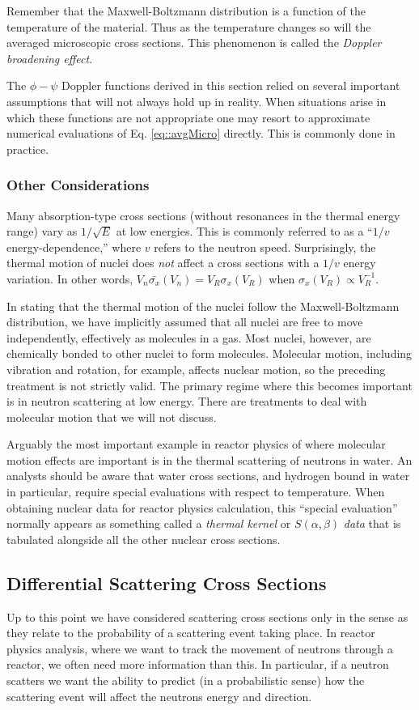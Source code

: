 \documentclass[11pt]{article}
\begin{document}
Remember that the Maxwell-Boltzmann distribution is a function of the temperature of the material.  Thus as the temperature changes so will the averaged microscopic cross sections.  This phenomenon is called the \emph{Doppler broadening effect}.

The \(\phi-\psi\) Doppler functions derived in this section relied on several important assumptions that will not always hold up in reality.  When situations arise in which these functions are not appropriate one may resort to approximate numerical evaluations of Eq. \ref{eq::avgMicro} directly.  This is commonly done in practice.
\subsubsection{Other Considerations}
\label{sec:orgheadline20}
Many absorption-type cross sections (without resonances in the thermal energy range) vary as \(1/\sqrt{E}\) at low energies.  This is commonly referred to as a ``\(1/v\) energy-dependence,'' where \(v\) refers to the neutron speed.  Surprisingly, the thermal motion of nuclei does \emph{not} affect a cross sections with a \(1/v\) energy variation.  In other words, \(V_n \bar{\sigma_x}(V_n) = V_R\sigma_x(V_R)\) when \(\sigma_x(V_R) \propto V_R^{-1}\).

In stating that the thermal motion of the nuclei follow the Maxwell-Boltzmann distribution, we have implicitly assumed that all nuclei are free to move independently, effectively as molecules in a gas.  Most nuclei, however, are chemically bonded to other nuclei to form molecules.  Molecular motion, including vibration and rotation, for example, affects nuclear motion, so the preceding treatment is not strictly valid.  The primary regime where this becomes important is in neutron scattering at low energy. There are treatments to deal with molecular motion that we will not discuss.  

Arguably the most important example in reactor physics of where molecular motion effects are important is in the thermal scattering of neutrons in water.  An analysts should be aware that water cross sections, and hydrogen bound in water in particular, require special evaluations with respect to temperature.  When obtaining nuclear data for reactor physics calculation, this ``special evaluation'' normally appears as something called a \emph{thermal kernel} or \(S(\alpha,\beta)\) \emph{data} that is tabulated alongside all the other nuclear cross sections.
\subsection{Differential Scattering Cross Sections}
\label{sec:orgheadline22}
Up to this point we have considered scattering cross sections only in the sense as they relate to the probability of a scattering event taking place.  In reactor physics analysis, where we want to track the movement of neutrons through a reactor, we often need more information than this.  In particular, if a neutron scatters we want the ability to predict (in a probabilistic sense) how the scattering event will affect the neutrons energy and direction.
\end{document}
